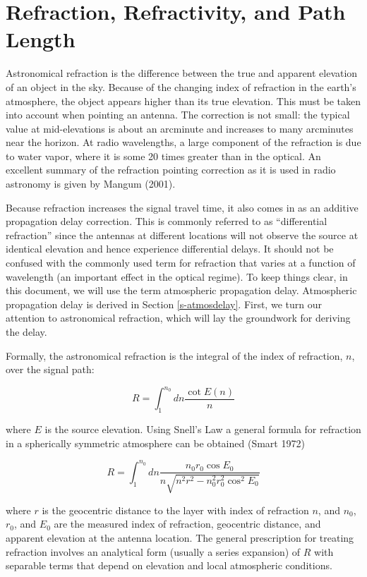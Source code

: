 \documentclass[preprint]{aastex}
\begin{document}
\section{Refraction, Refractivity, and Path Length\label{s-refraction}}
Astronomical refraction is the difference between the true and apparent
elevation of an object in the sky. Because of the changing index of
refraction in the earth's atmosphere, the object appears higher than
its true elevation.  This must be taken into account when pointing an
antenna. The correction is not small: the typical value at mid-elevations
is about an arcminute and increases to many arcminutes near the horizon.
At radio wavelengths, a large component of the refraction is due to
water vapor, where it is some 20 times greater than in the optical.
An excellent summary of the refraction pointing correction as it is used
in radio astronomy is given by Mangum (2001).

Because refraction increases the signal travel time, it also comes in as
an additive propagation delay correction.  This is commonly referred to
as ``differential refraction'' since the antennas at different locations
will not observe the source at identical elevation and hence experience
differential delays.  It should not be confused with the commonly
used term for refraction that varies at a function of wavelength
(an important effect in the optical regime).  To keep things clear,
in this document, we will use the term atmospheric propagation delay.
Atmospheric propagation delay is derived in Section \ref{s-atmosdelay}.
First, we turn our attention to astronomical refraction, which will
lay the groundwork for deriving the delay.

Formally, the astronomical refraction is the integral of the
index of refraction, $n$, over the signal path:

\begin{equation}
R = \int_{1}^{n_0} dn \frac{\cot E(n)}{n}
\label{e-Rdef}
\end{equation}

\noindent where $E$ is the source elevation.  Using Snell's Law a general
formula for refraction in a spherically symmetric atmosphere can be obtained
(Smart 1972)

\begin{equation}
R = \int_{1}^{n_0} dn \frac{n_0 r_0 \cos E_0}
{n \sqrt{n^2 r^2 - n_0^2 r_0^2 \cos^2 E_0} }
\label{e-smart}
\end{equation} 

\noindent where $r$ is the geocentric distance to the layer with index of
refraction $n$, and $n_0$, $r_0$, and $E_0$ are the measured index of
refraction, geocentric distance, and apparent elevation at the antenna 
location.  The general prescription
for treating refraction involves an analytical form (usually a series expansion)
of $R$ with separable
terms that depend on elevation and local atmospheric conditions.
\end{document}
